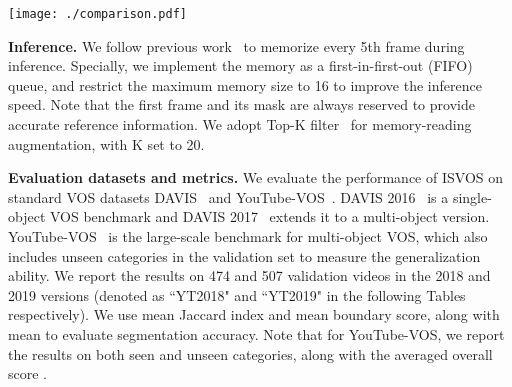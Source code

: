 \documentclass[10pt,twocolumn,letterpaper]{article}
\newcommand{\system}{ISVOS\xspace}
\begin{document}
\begin{figure*}[t]
  \centering
   \texttt{[image: ./comparison.pdf]}
   \vspace{-0.25in}
   \caption{Qualitative comparisons between \system and several state-of-the-art memory-based VOS models, including RDE~\cite{li2022recurrent}, STCN~\cite{cheng2021stcn}, and XMem~\cite{cheng2022xmem}.}
   \label{fig:comparison}
\end{figure*}

\vspace{0.02in}
\noindent \textbf{Inference.} We follow previous work~\cite{oh2019video,seong2020kernelized,cheng2021stcn,cheng2022xmem} to memorize every 5th frame during inference. Specially, we implement the memory as a first-in-first-out (FIFO) queue, and restrict the maximum memory size to 16 to improve the inference speed. Note that the first frame and its mask are always reserved to provide accurate reference information. We adopt Top-K filter~\cite{cheng2021mivos,cheng2021stcn,cheng2022xmem} for memory-reading augmentation, with K set to 20.

\vspace{0.02in}
\noindent \textbf{Evaluation datasets and metrics.} We evaluate the performance of \system on standard VOS datasets DAVIS~\cite{perazzi2016benchmark,pont20172017} and YouTube-VOS~\cite{xu2018YouTube}. DAVIS 2016~\cite{perazzi2016benchmark} is a single-object VOS benchmark and DAVIS 2017~\cite{pont20172017} extends it to a multi-object version. YouTube-VOS~\cite{xu2018YouTube} is the large-scale benchmark for multi-object VOS, which also includes unseen categories in the validation set to measure the generalization ability. We report the results on 474 and 507 validation videos in the 2018 and 2019 versions (denoted as ``YT2018" and ``YT2019" in the following Tables respectively). We use mean Jaccard  index and mean boundary  score, along with mean  to evaluate segmentation accuracy. Note that for YouTube-VOS, we report the results on both seen and unseen categories, along with the averaged overall score . 
\end{document}
